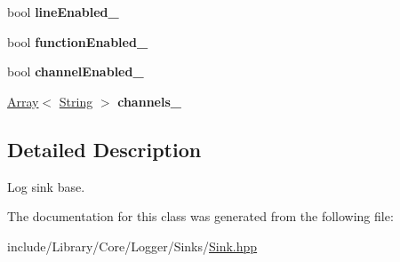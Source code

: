\begin{DoxyCompactItemize}
bool {\bfseries line\+Enabled\+\_\+}
\item 
\mbox{\label{classlibrary_1_1core_1_1logger_1_1sinks_1_1_sink_acb68b94fd8745d1e06d1cc1f2caa2e73}} 
bool {\bfseries function\+Enabled\+\_\+}
\item 
\mbox{\label{classlibrary_1_1core_1_1logger_1_1sinks_1_1_sink_a48307be32eede5359f345b54363070ae}} 
bool {\bfseries channel\+Enabled\+\_\+}
\item 
\mbox{\label{classlibrary_1_1core_1_1logger_1_1sinks_1_1_sink_a3ba1eb6372e9bf6d2d8b3ff53d529021}} 
\hyperlink{classlibrary_1_1core_1_1ctnr_1_1_array}{Array}$<$ \hyperlink{classlibrary_1_1core_1_1types_1_1_string}{String} $>$ {\bfseries channels\+\_\+}
\end{DoxyCompactItemize}


\subsection{Detailed Description}
Log sink base. 

The documentation for this class was generated from the following file\+:\begin{DoxyCompactItemize}
\item 
include/\+Library/\+Core/\+Logger/\+Sinks/\hyperlink{_sinks_2_sink_8hpp}{Sink.\+hpp}\end{DoxyCompactItemize}
